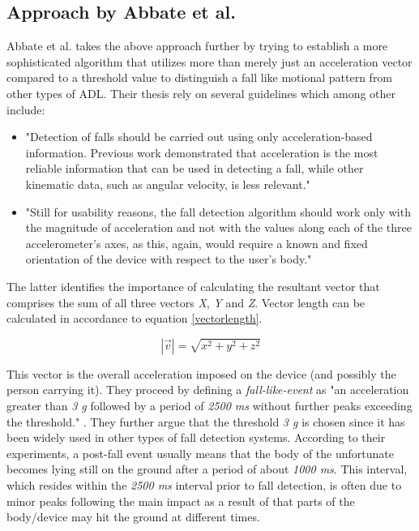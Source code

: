\documentclass[12pt, a4paper, onecolumn]{article}
\begin{document}
	\subsection{Approach by Abbate et al.} \label{section:approach-by-abbate}
	Abbate et al. takes the above approach further by trying to establish a more sophisticated algorithm that utilizes more than merely just an acceleration vector compared to a threshold value to distinguish a fall like motional pattern from other types of ADL. Their thesis rely on several guidelines which among other include: 
	\begin{itemize} 
		\item "Detection of falls should be carried out using only acceleration-based information. Previous work demonstrated that acceleration is the most reliable information that can be used in detecting a fall, while other kinematic data, such as angular velocity, is less relevant." \cite[p~3]{piza_uni}
		
		\item "Still for usability reasons, the fall detection algorithm should work only with the magnitude of acceleration and not with the values along each of the three accelerometer’s axes, as this, again, would require a known and fixed orientation of the device with respect to the user’s body." \cite[p~3]{piza_uni}
	\end{itemize}
	
	The latter identifies the importance of calculating the resultant vector that comprises the sum of all three vectors \textit{X}, \textit{Y} and \textit{Z}. Vector length can be calculated in accordance to equation \ref{vectorlength}.
	
	\begin{equation}
	\label{vectorlength}
	|\vec{v}|=\sqrt{x^2+y^2+z^2}
	\end{equation}
	
	This vector is the overall acceleration imposed on the device (and possibly the person carrying it). They proceed by defining a \textit{fall-like-event} as "an acceleration greater than \textit{3 g} followed by a period of \textit{2500 ms} without further peaks exceeding the threshold." \cite[p~5]{piza_uni}. They further argue that the threshold \textit{3 g} is chosen since it has been widely used in other types of fall detection systems. According to their experiments, a post-fall event usually means that the body of the unfortunate becomes lying still on the ground after a period of about \textit{1000 ms}. This interval, which resides within the \textit{2500 ms} interval prior to fall detection, is often due to minor peaks following the main impact as a result of that parts of the body/device may hit the ground at different times. 
	
\end{document}
